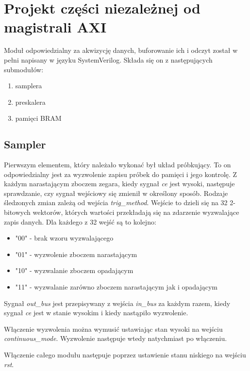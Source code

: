 \chapter{Projekt części niezależnej od magistrali AXI}

Moduł odpowiedzialny za akwizycję danych, buforowanie ich i odczyt został w pełni napisany w języku SystemVerilog. Składa się on z następujących submodułów:

\begin{enumerate}
	\item samplera
	\item preskalera
	\item pamięci BRAM
\end{enumerate}


\section{Sampler}

Pierwszym elementem, który należało wykonać był układ próbkujący. To on odpowiedzialny jest za wyzwolenie zapisu próbek do pamięci i jego kontrolę. Z każdym narastającym zboczem zegara, kiedy sygnał \emph{ce} jest wysoki, następuje sprawdzanie, czy sygnał wejściowy się zmienił w określony sposób. Rodzaje śledzonych zmian zależą od wejścia \emph{trig\_method}. Wejście to dzieli się na 32 2-bitowych wektorów, których wartości przekładają się na zdarzenie wyzwalające zapis danych. Dla każdego z 32 wejść są to kolejno:
	
	\begin{itemize}
		\item "00" - brak wzoru wyzwalającego
		\item "01" - wyzwolenie zboczem narastającym
		\item "10" - wyzwalanie zboczem opadającym
		\item "11" - wyzwalanie zarówno zboczem narastającym jak i opadającym
	\end{itemize}
	
Sygnał \emph{out\_bus} jest przepisywany z wejścia \emph{in\_bus} za każdym razem, kiedy sygnał \emph{ce} jest w stanie wysokim i kiedy nastąpiło wyzwolenie.

Włączenie wyzwolenia można wymusić ustawiając stan wysoki na wejściu \emph{continuous\_mode}. Wyzwolenie następuje wtedy natychmiast po włączeniu.

Włączenie całego modułu następuje poprzez ustawienie stanu niskiego na wejściu \emph{rst}.

